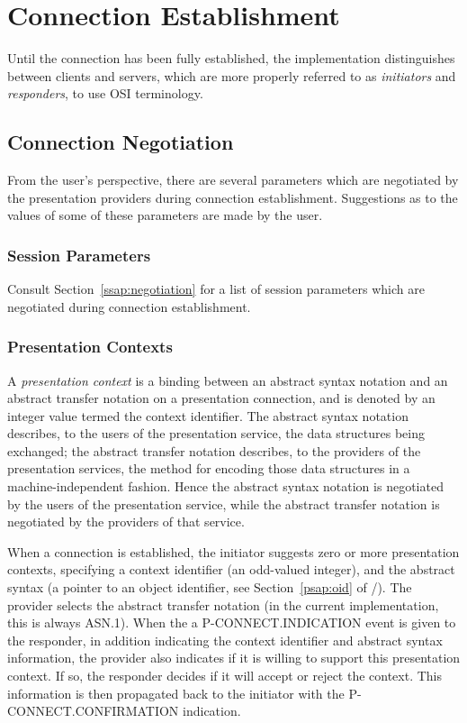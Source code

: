 \section	{Connection Establishment}
Until the connection has been fully established,
the implementation distinguishes between clients and servers,
which are more properly referred to as {\em initiators\/} and
{\em responders}, to use OSI terminology.

\subsection	{Connection Negotiation}
From the user's perspective,
there are several parameters which are negotiated by the presentation providers
during connection establishment.
Suggestions as to the values of some of these parameters are made by the user.

\subsubsection	{Session Parameters}
Consult Section~\ref{ssap:negotiation} for a list of session parameters which
are negotiated during connection establishment.

\subsubsection	{Presentation Contexts}\label{psap:context}
A {\em presentation context\/} is a binding between an abstract syntax
notation and an abstract transfer notation on a
presentation connection,
and is denoted by an integer value termed the context identifier.
The abstract syntax notation describes,
to the users of the presentation service,
the data structures being exchanged;
the abstract transfer notation describes,
to the providers of the presentation services,
the method for encoding those data structures in a machine-independent fashion.
Hence the abstract syntax notation is negotiated by the users of the
presentation service,
while the abstract transfer notation is negotiated by the providers of that
service.

When a connection is established,
the initiator suggests zero or more presentation contexts,
specifying a context identifier (an odd-valued integer),
and the abstract syntax
(a pointer to an object identifier, see Section~\ref{psap:oid} of \volone/).
The provider selects the abstract transfer notation
(in the current implementation, this is always ASN.1\cite{ISO.PP.Encoding}).
When the a {\sf P-CONNECT.INDICATION\/} event is given to the responder,
in addition 
indicating the context identifier and abstract syntax information,
the provider also indicates if it is willing to support this presentation
context.
If so, the responder decides if it will accept or reject the context.
This information is then propagated back to the initiator with
the {\sf P-CONNECT.CONFIRMATION\/} indication.

